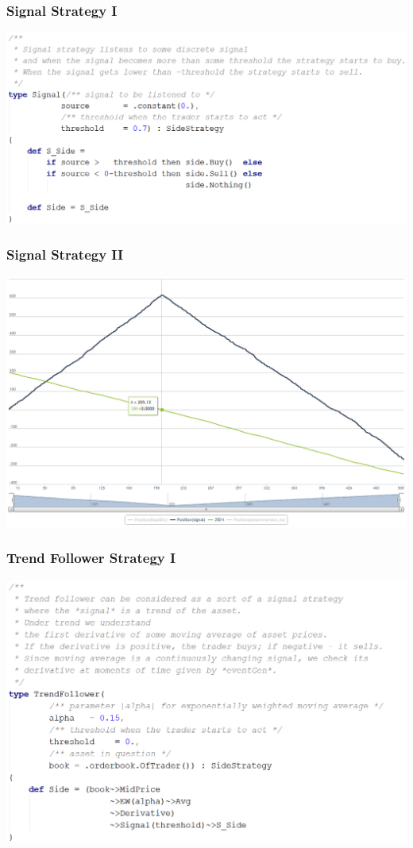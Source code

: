 \documentclass{beamer}
\begin{document}
\begin{frame}
\frametitle{Signal Strategy I}
\includegraphics[width=1\linewidth]{signal_strategy.png}
\end{frame}
\begin{frame}
\frametitle{Signal Strategy II}
\includegraphics[width=1\linewidth]{signal.png}
\end{frame}
\begin{frame}
\frametitle{Trend Follower Strategy I}
\includegraphics[width=1\linewidth]{trendfollower_strategy.png}
\end{frame}
\end{document}
